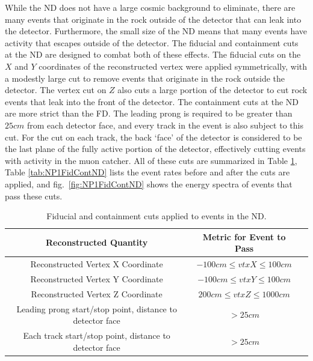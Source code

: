 While the ND does not have a large cosmic background to eliminate, there are many events that originate in the rock outside of the detector that can leak into the detector. Furthermore, the small size of the ND means that many events have activity that escapes outside of the detector. The fiducial and containment cuts at the ND are designed to combat both of these effects. The fiducial cuts on the $X$ and $Y$ coordinates of the reconstructed vertex were applied symmetrically, with a modestly large cut to remove events that originate in the rock outside the detector. The vertex cut on $Z$ also cuts a large portion of the detector to cut rock events that leak into the front of the detector. The containment cuts at the ND are more strict than the FD. The leading prong is required to be greater than $25\unit{cm}$ from each detector face, and every track in the event is also subject to this cut. For the cut on each track, the back `face' of the detector is considered to be the last plane of the fully active portion of the detector, effectively cutting events with activity in the muon catcher. All of these cuts are summarized in Table \ref{tab:FidContND}, Table \ref{tab:NP1FidContND} lists the event rates before and after the cuts are applied, and fig.~\ref{fig:NP1FidContND} shows the energy spectra of events that pass these cuts.
\begin{table}[h]
  \begin{center}
    \caption[ND Fiducial and Containment Cuts]{Fiducial and containment cuts applied to events in the ND.}
    \label{tab:FidContND}
    \begin{tabular}{c c c}
      \hline\hline
      Reconstructed Quantity & Metric for Event to Pass \\
      \hline
      Reconstructed Vertex X Coordinate & $-100\unit{cm} \leq vtxX \leq 100\unit{cm} $ \\
      Reconstructed Vertex Y Coordinate & $-100\unit{cm} \leq vtxY \leq 100\unit{cm}$ \\
      Reconstructed Vertex Z Coordinate & $200\unit{cm} \leq vtxZ \leq 1000\unit{cm}$ \\
      Leading prong start/stop point, distance to detector face & $> 25\unit{cm}$ \\
      Each track start/stop point, distance to detector face & $> 25\unit{cm}$ \\
      \hline
    \end{tabular}
  \end{center}
\end{table}

